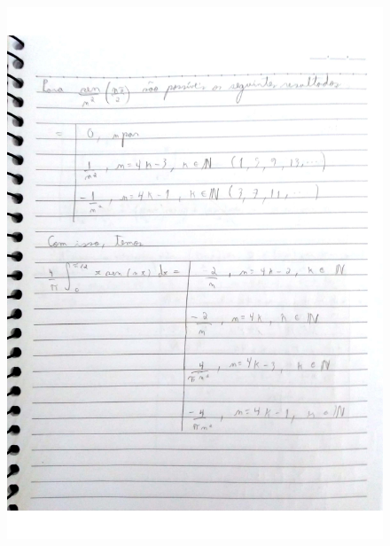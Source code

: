 \documentclass[a4paper]{article}
\begin{document}
        \begin{figure}{\textwidth}
            \centering
            \includegraphics[width=\textwidth]{Questoes-1-3_page-0009.jpg}
        \end{figure}
\end{document}
